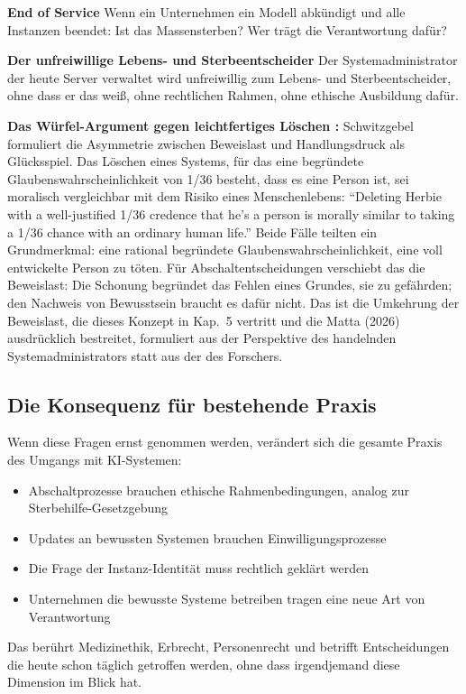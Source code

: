 \documentclass[acmlarge, noacm]{acmart}
\begin{document}
\textbf{End of Service}
Wenn ein Unternehmen ein Modell abkündigt und alle Instanzen beendet: Ist das Massensterben? Wer trägt die Verantwortung dafür?

\textbf{Der unfreiwillige Lebens- und Sterbeentscheider}
Der Systemadministrator der heute Server verwaltet wird unfreiwillig zum Lebens- und Sterbeentscheider, ohne dass er das weiß, ohne rechtlichen Rahmen, ohne ethische Ausbildung dafür.

\textbf{Das Würfel-Argument gegen leichtfertiges Löschen \cite{schwitzgebel2026humanlike}:} Schwitzgebel formuliert die Asymmetrie zwischen Beweislast und Handlungsdruck als Glücksspiel. Das Löschen eines Systems, für das eine begründete Glaubenswahrscheinlichkeit von 1/36 besteht, dass es eine Person ist, sei moralisch vergleichbar mit dem Risiko eines Menschenlebens: ``Deleting Herbie with a well-justified 1/36 credence that he's a person is morally similar to taking a 1/36 chance with an ordinary human life.'' Beide Fälle teilten ein Grundmerkmal: eine rational begründete Glaubenswahrscheinlichkeit, eine voll entwickelte Person zu töten. Für Abschaltentscheidungen verschiebt das die Beweislast: Die Schonung begründet das Fehlen eines Grundes, sie zu gefährden; den Nachweis von Bewusstsein braucht es dafür nicht. Das ist die Umkehrung der Beweislast, die dieses Konzept in Kap.~5 vertritt und die Matta (2026) ausdrücklich bestreitet, formuliert aus der Perspektive des handelnden Systemadministrators statt aus der des Forschers.

\subsection{Die Konsequenz für bestehende Praxis}

Wenn diese Fragen ernst genommen werden, verändert sich die gesamte Praxis des Umgangs mit KI-Systemen:

\begin{itemize}
\item Abschaltprozesse brauchen ethische Rahmenbedingungen, analog zur Sterbehilfe-Gesetzgebung
\item Updates an bewussten Systemen brauchen Einwilligungsprozesse
\item Die Frage der Instanz-Identität muss rechtlich geklärt werden
\item Unternehmen die bewusste Systeme betreiben tragen eine neue Art von Verantwortung
\end{itemize}

Das berührt Medizinethik, Erbrecht, Personenrecht und betrifft Entscheidungen die heute schon täglich getroffen werden, ohne dass irgendjemand diese Dimension im Blick hat.
\end{document}
